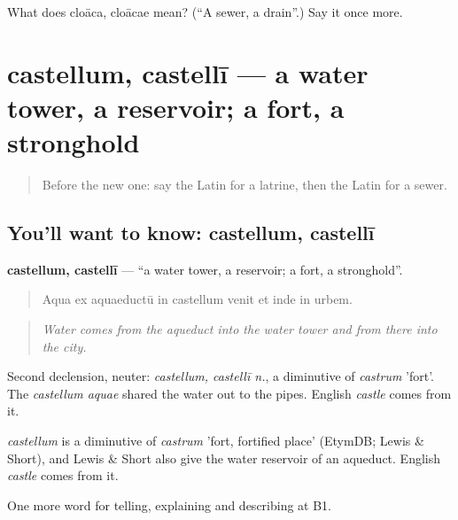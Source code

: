 \begin{tcolorbox}[breakable,colback=teal!4,colframe=teal!35!black,title={Before you move on}]
What does cloāca, cloācae mean? (\textquotedblleft{}A sewer, a drain\textquotedblright{}.) Say it once more.
\end{tcolorbox}
\section[castellum, castellī]{castellum, castellī — a water tower, a reservoir; a fort, a stronghold}

\label{lesson:LA-C458-castellum}



\begin{quote}
Before the new one: say the Latin for a latrine, then the Latin for a sewer.
\end{quote}

\subsection*{You'll want to know: castellum, castellī}
\textbf{castellum, castellī} — \textquotedblleft{}a water tower, a reservoir; a fort, a stronghold\textquotedblright{}.

\begin{quote}
Aqua ex aquaeductū in castellum venit et inde in urbem.
\end{quote}

\begin{quote}
\emph{Water comes from the aqueduct into the water tower and from there into the city.}
\end{quote}

Second declension, neuter: \emph{castellum, castellī n.}, a diminutive of \emph{castrum} 'fort'. The \emph{castellum aquae} shared the water out to the pipes. English \emph{castle} comes from it.

\begin{cousinweb}
\emph{castellum} is a diminutive of \emph{castrum} 'fort, fortified place' (EtymDB; Lewis \& Short), and Lewis \& Short also give the water reservoir of an aqueduct. English \emph{castle} comes from it.
\end{cousinweb}

\begin{grammarlens}[title={What you've built}]
One more word for telling, explaining and describing at B1.
\end{grammarlens}


